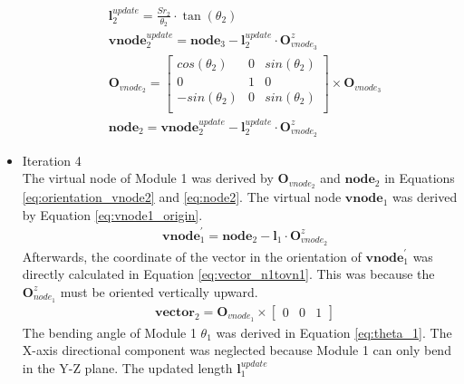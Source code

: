\begin{itemize}
\begin{align}
        &\textbf{l}_{2}^{update} = \frac{Sr_2}{\theta_2}\cdot \tan(\theta_2)
        \label{eq:virtual_length_2} \\
        &\textbf{vnode}_{2}^{update} = \textbf{node}_{3} - \textbf{l}_{2}^{update} \cdot \textbf{O}_{vnode_3}^{z}
        \label{eq:vnode2_update} \\
        &\textbf{O}_{vnode_2} =     
        \begin{bmatrix}
            cos(\theta_2) & 0 & sin(\theta_2) \\
            0 & 1 & 0 \\
            -sin(\theta_2) & 0 & sin(\theta_2) \\
        \end{bmatrix}  
        \times \textbf{O}_{vnode_3}
        \label{eq:orientation_vnode2} \\
        &\textbf{node}_2 = \textbf{vnode}_{2}^{update} - \textbf{l}_{2}^{update} \cdot \textbf{O}_{vnode_2}^{z}
        \label{eq:node2} 
    \end{align}
    \vspace{-15mm}
    \item Iteration 4 \\ %
    The virtual node of Module 1 was derived by $\textbf{O}_{vnode_2}$ and $\textbf{node}_{2}$ in Equations 
    \ref{eq:orientation_vnode2} and \ref{eq:node2}. The virtual node $\textbf{vnode}_{1}$ was derived by Equation 
    \ref{eq:vnode1_origin}.
    \vspace{-5mm}
    \begin{align}
        &\textbf{vnode}_{1}^{'} = \textbf{node}_{2} - \textbf{l}_{1} \cdot \textbf{O}_{vnode_2}^{z}
        \label{eq:vnode1_origin}
    \end{align}
    Afterwards, the coordinate of the vector in the orientation of $\textbf{vnode}_{1}^{'}$ was directly calculated 
    in Equation \ref{eq:vector_n1tovn1}. This was because the $\textbf{O}_{node_1}^{z}$ must be oriented vertically upward.
    \vspace{-5mm}
    \begin{align}
        &\textbf{vector}_{2} = \textbf{O}_{vnode_1} \times \begin{bmatrix} 0 & 0 & 1 \end{bmatrix} 
        \label{eq:vector_n1tovn1} 
    \end{align}
    The bending angle of Module 1 $\theta_1$ was derived in Equation \ref{eq:theta_1}. The X-axis directional 
    component was neglected because Module 1 can only bend in the Y-Z plane. The updated length $\textbf{l}_{1}^{update}$ 

\end{itemize}
